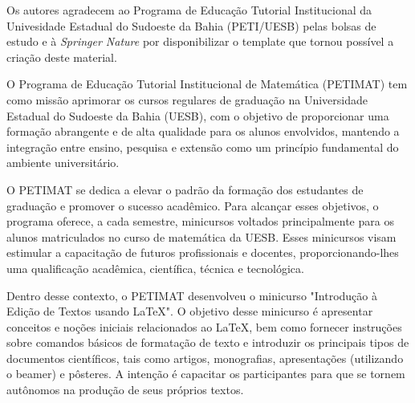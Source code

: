 %
%


Os autores agradecem ao Programa de Educa\c c\~ao Tutorial Institucional da Univesidade Estadual do Sudoeste da Bahia (PETI/UESB) pelas bolsas de estudo e à \textit{Springer Nature} por disponibilizar o template que tornou poss\'ivel a cria\c c\~ao deste material. 

\noindent O Programa de Educa\c c\~ao Tutorial Institucional de Matem\'atica (PETIMAT) tem como miss\~ao aprimorar os cursos regulares de gradua\c c\~ao na Universidade Estadual do Sudoeste da Bahia (UESB), com o objetivo de proporcionar uma forma\c c\~ao abrangente e de alta qualidade para os alunos envolvidos, mantendo a integra\c c\~ao entre ensino, pesquisa e extens\~ao como um princ\'ipio fundamental do ambiente universit\'ario.

\noindent O PETIMAT se dedica a elevar o padr\~ao da forma\c c\~ao dos estudantes de gradua\c c\~ao e promover o sucesso acad\^emico. Para alcan\c car esses objetivos, o programa oferece, a cada semestre, minicursos voltados principalmente para os alunos matriculados no curso de matem\'atica da UESB. Esses minicursos visam estimular a capacita\c c\~ao de futuros profissionais e docentes, proporcionando-lhes uma qualificação acad\^emica, cient\'ifica, t\'ecnica e tecnol\'ogica. 

\noindent Dentro desse contexto, o PETIMAT desenvolveu o minicurso "Introdução \`a Edi\c c\~ao de Textos usando LaTeX". O objetivo desse minicurso \'e apresentar conceitos e no\c c\~oes iniciais relacionados ao LaTeX, bem como fornecer instru\c c\~oes sobre comandos b\'asicos de formata\c c\~ao de texto e introduzir os principais tipos de documentos cient\'ificos, tais como artigos, monografias, apresenta\c c\~oes (utilizando o beamer) e p\^osteres. A inten\c c\~ao \'e capacitar os participantes para que se tornem aut\^onomos na produ\c c\~ao de seus pr\'oprios textos.

